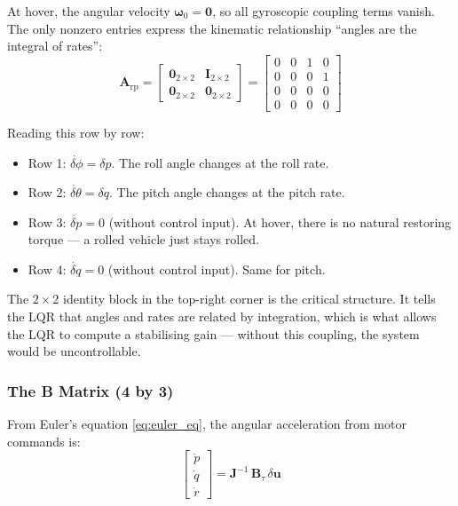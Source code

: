 \documentclass[12pt, a4paper]{article}
\newcommand{\bu}{\bm{u}}
\newcommand{\bomega}{\bm{\omega}}
\newcommand{\bJ}{\bm{J}}
\newcommand{\bA}{\bm{A}}
\newcommand{\bB}{\bm{B}}
\newcommand{\bI}{\bm{I}}
\newcommand{\bzero}{\bm{0}}
\begin{document}
At hover, the angular velocity $\bomega_0 = \bm{0}$, so all gyroscopic coupling terms vanish.  The only nonzero entries express the kinematic relationship ``angles are the integral of rates'':
\begin{equation}
    \bA_{\text{rp}} = \begin{bmatrix}
        \bzero_{2\times2} & \bI_{2\times2} \\
        \bzero_{2\times2} & \bzero_{2\times2}
    \end{bmatrix}
    = \begin{bmatrix}
        0 & 0 & 1 & 0 \\
        0 & 0 & 0 & 1 \\
        0 & 0 & 0 & 0 \\
        0 & 0 & 0 & 0
    \end{bmatrix}
\end{equation}

Reading this row by row:
\begin{itemize}
    \item Row 1: $\dot{\delta\phi} = \delta p$.  The roll angle changes at the roll rate.
    \item Row 2: $\dot{\delta\theta} = \delta q$.  The pitch angle changes at the pitch rate.
    \item Row 3: $\dot{\delta p} = 0$ (without control input).  At hover, there is no natural restoring torque --- a rolled vehicle just stays rolled.
    \item Row 4: $\dot{\delta q} = 0$ (without control input).  Same for pitch.
\end{itemize}

The $2 \times 2$ identity block in the top-right corner is the critical structure.  It tells the LQR that angles and rates are related by integration, which is what allows the LQR to compute a stabilising gain --- without this coupling, the system would be uncontrollable.

\subsubsection{The B Matrix (4 by 3)}

From Euler's equation \eqref{eq:euler_eq}, the angular acceleration from motor commands is:
\begin{equation}
    \begin{bmatrix} \dot{p} \\ \dot{q} \\ \dot{r} \end{bmatrix}
    = \bJ^{-1} \, \bB_\tau \, \delta \bu
\end{equation}
\end{document}
